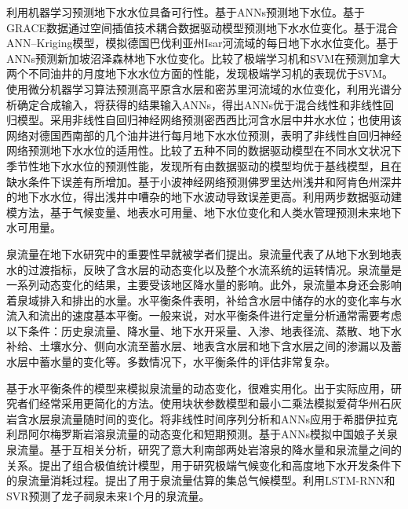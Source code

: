 利用机器学习预测地下水水位具备可行性。\citet{coppola2003artificial}基于ANNs预测地下水位。\citet{sun2013predicting}基于GRACE数据通过空间插值技术耦合数据驱动模型预测地下水水位变化。\citet{tapoglou2014spatio}基于混合ANN--Kriging模型，模拟德国巴伐利亚州Isar河流域的每日地下水水位变化。\citet{Sun2015Technical}基于ANNs预测新加坡沼泽森林地下水位变化。\citet{yadav2017assessing}比较了极端学习机和SVM在预测加拿大两个不同油井的月度地下水水位方面的性能，发现极端学习机的表现优于SVM。\citet{sahoo2017machine}使用微分机器学习算法预测高平原含水层和密苏里河流域的水位变化，利用光谱分析确定合成输入，将获得的结果输入ANNs，得出ANNs优于混合线性和非线性回归模型。\citet{guzman2017use}采用非线性自回归神经网络预测密西西比河含水层中井水水位；\citet{wunsch2018forecasting}也使用该网络对德国西南部的几个油井进行每月地下水水位预测，表明了非线性自回归神经网络预测地下水水位的适用性。\citet{amaranto2018semi}比较了五种不同的数据驱动模型在不同水文状况下季节性地下水水位的预测性能，发现所有由数据驱动的模型均优于基线模型，且在缺水条件下误差有所增加。\citet{Rakhshandehroo2018Long}基于小波神经网络预测佛罗里达州浅井和阿肯色州深井的地下水水位，得出浅井中嘈杂的地下水波动导致误差更高。\citet{amaranto2019spatially}利用两步数据驱动建模方法，基于气候变量、地表水可用量、地下水位变化和人类水管理预测未来地下水可用量。

泉流量在地下水研究中的重要性早就被学者们提出\citep{toth1971groundwater,toth1999groundwater}。泉流量代表了从地下水到地表水的过渡指标，反映了含水层的动态变化以及整个水流系统的运转情况。泉流量是一系列动态变化的结果，主要受该地区降水量的影响。此外，泉流量本身还会影响着泉域排入和排出的水量。水平衡条件表明，补给含水层中储存的水的变化率与水流入和流出的速度基本平衡。一般来说，对水平衡条件进行定量分析通常需要考虑以下条件：历史泉流量、降水量、地下水开采量、入渗、地表径流、蒸散、地下水补给、土壤水分、侧向水流至蓄水层、地表含水层和地下含水层之间的渗漏以及蓄水层中蓄水量的变化等。多数情况下，水平衡条件的评估非常复杂。

基于水平衡条件的模型来模拟泉流量的动态变化，很难实用化。出于实际应用，研究者们经常采用更简化的方法。\citet{zhang1996simulation}使用块状参数模型和最小二乘法模拟爱荷华州石灰岩含水层泉流量随时间的变化。\citet{lambrakis2000nonlinear}将非线性时间序列分析和ANNs应用于希腊伊拉克利昂阿尔梅罗斯岩溶泉流量的动态变化和短期预测。\citet{hu2008simulation}基于ANNs模拟中国娘子关泉泉流量。\citet{fiorillo2010relation}基于互相关分析，研究了意大利南部两处岩溶泉的降水量和泉流量之间的关系。\citet{fan2013assembled}提出了组合极值统计模型，用于研究极端气候变化和高度地下水开发条件下的泉流量消耗过程。\citet{diodato2014predicting}提出了用于泉流量估算的集总气候模型。\citet{cheng2021machine}利用LSTM-RNN和SVR预测了龙子祠泉未来1个月的泉流量。

